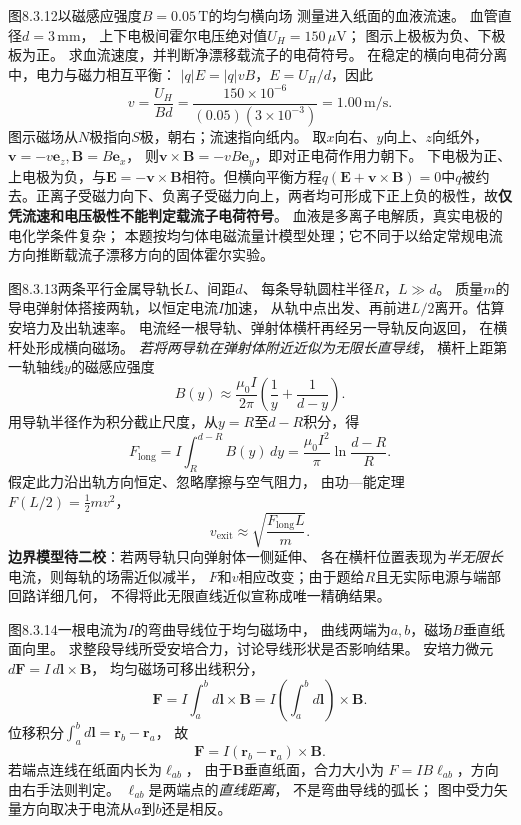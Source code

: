\problemtext 图8.3.12以磁感应强度$B=0.05\,\mathrm T$的均匀横向场
测量进入纸面的血液流速。
血管直径$d=3\,\mathrm{mm}$，
上下电极间霍尔电压绝对值$U_H=150\,\mu\mathrm V$；
图示上极板为负、下极板为正。
求血流速度，并判断净漂移载流子的电荷符号。
\workings
在稳定的横向电荷分离中，电力与磁力相互平衡：
$|q|E=|q|vB$，$E=U_H/d$，因此
\[
\boxed{v=\frac{U_H}{Bd}
=\frac{150\times10^{-6}}{(0.05)(3\times10^{-3})}
=1.00\,\mathrm{m/s}}.
\]
图示磁场从$N$极指向$S$极，朝右；流速指向纸内。
取$x$向右、$y$向上、$z$向纸外，
$\bm v=-v\bm e_z,\bm B=B\bm e_x$，
则$\bm v\times\bm B=-vB\bm e_y$，即对正电荷作用力朝下。
下电极为正、上电极为负，与$\bm E=-\bm v\times\bm B$相符。但横向平衡方程$q(\bm E+\bm v\times\bm B)=0$中$q$被约去。正离子受磁力向下、负离子受磁力向上，两者均可形成下正上负的极性，故\textbf{仅凭流速和电压极性不能判定载流子电荷符号}。
\crosscheck 血液是多离子电解质，真实电极的电化学条件复杂；
本题按均匀体电磁流量计模型处理；它不同于以给定常规电流方向推断载流子漂移方向的固体霍尔实验。

\problemtext 图8.3.13两条平行金属导轨长$L$、间距$d$、
每条导轨圆柱半径$R$，$L\gg d$。
质量$m$的导电弹射体搭接两轨，以恒定电流$I$加速，
从轨中点出发、再前进$L/2$离开。估算安培力及出轨速率。
\workings
电流经一根导轨、弹射体横杆再经另一导轨反向返回，
在横杆处形成横向磁场。
\emph{若将两导轨在弹射体附近近似为无限长直导线}，
横杆上距第一轨轴线$y$的磁感应强度
\[
B(y)\approx\frac{\mu_0I}{2\pi}
\left(\frac1y+\frac1{d-y}\right).
\]
用导轨半径作为积分截止尺度，从$y=R$至$d-R$积分，得
\[
\boxed{F_{\mathrm{long}}=
I\int_R^{d-R}B(y)\,dy
=\frac{\mu_0I^2}{\pi}
\ln\frac{d-R}{R}}.
\]
假定此力沿出轨方向恒定、忽略摩擦与空气阻力，
由功—能定理$F(L/2)=\tfrac12mv^2$，
\[
\boxed{v_{\mathrm{exit}}\approx
\sqrt{\frac{F_{\mathrm{long}}L}{m}}}.
\]
\crosscheck \textbf{边界模型待二校}：若两导轨只向弹射体一侧延伸、
各在横杆位置表现为\emph{半无限长}电流，则每轨的场需近似减半，
$F$和$v$相应改变；由于题给$R$且无实际电源与端部回路详细几何，
不得将此无限直线近似宣称成唯一精确结果。

\problemtext 图8.3.14一根电流为$I$的弯曲导线位于均匀磁场中，
曲线两端为$a,b$，磁场$B$垂直纸面向里。
求整段导线所受安培合力，讨论导线形状是否影响结果。
\workings
安培力微元$d\bm F=I\,d\bm l\times\bm B$，
均匀磁场可移出线积分，
\[
\bm F=I\int_a^b d\bm l\times\bm B
=I\left(\int_a^b d\bm l\right)\times\bm B.
\]
位移积分$\int_a^b d\bm l=\bm r_b-\bm r_a$，
故
\[
\boxed{\bm F=I(\bm r_b-\bm r_a)\times\bm B}.
\]
若端点连线在纸面内长为$\ell_{ab}$，
由于$\bm B$垂直纸面，合力大小为
$\boxed{F=IB\ell_{ab}}$，方向由右手法则判定。
\crosscheck $\ell_{ab}$是两端点的\emph{直线距离}，
不是弯曲导线的弧长；
图中受力矢量方向取决于电流从$a$到$b$还是相反。

